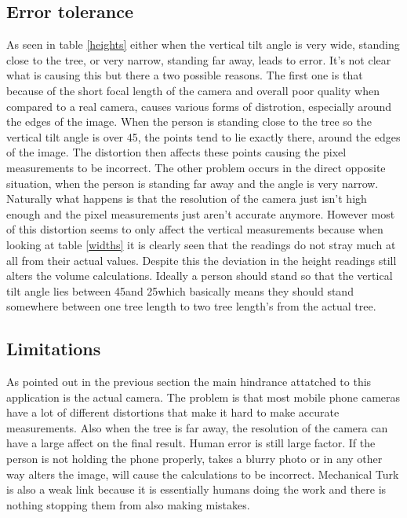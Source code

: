 \subsection{Error tolerance}
As seen in table \ref{heights} either when the vertical tilt angle is very wide, standing close to the tree, or very narrow, standing far away, leads to error. It's not clear what is causing this but there a two possible reasons. The first one is that because of the short focal length of the camera and overall poor quality when compared to a real camera, causes various forms of distrotion, especially around the edges of the image. When the person is standing close to the tree so the vertical tilt angle is over 45\degree, the points tend to lie exactly there, around the edges of the image. The distortion then affects these points causing the pixel measurements to be incorrect. The other problem occurs in the direct opposite situation, when the person is standing far away and the angle is very narrow. Naturally what happens is that the resolution of the camera just isn't high enough and the pixel measurements just aren't accurate anymore. However most of this distortion seems to only affect the vertical measurements because when looking at table \ref{widths} it is clearly seen that the readings do not stray much at all from their actual values. Despite this the deviation in the height readings still alters the volume calculations. Ideally a person should stand so that the vertical tilt angle lies between 45\degree and 25\degree which basically means they should stand somewhere between one tree length to two tree length's from the actual tree.
\subsection{Limitations}
As pointed out in the previous section the main hindrance attatched to this application is the actual camera. The problem is that most mobile phone cameras have a lot of different distortions that make it hard to make accurate measurements. Also when the tree is far away, the resolution of the camera can have a large affect on the final result. Human error is still large factor. If the person is not holding the phone properly, takes a blurry photo or in any other way alters the image, will cause the calculations to be incorrect. Mechanical Turk is also a weak link because it is essentially humans doing the work and there is nothing stopping them from also making mistakes. 
